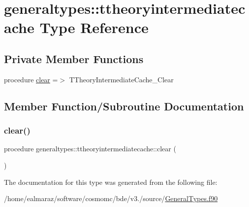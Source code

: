 \hypertarget{structgeneraltypes_1_1ttheoryintermediatecache}{}\section{generaltypes\+:\+:ttheoryintermediatecache Type Reference}
\label{structgeneraltypes_1_1ttheoryintermediatecache}
\subsection*{Private Member Functions}
\begin{DoxyCompactItemize}
\item 
procedure \mbox{\hyperlink{structgeneraltypes_1_1ttheoryintermediatecache_aeaec07f4f40b76814158d58e18392e91}{clear}} =$>$ T\+Theory\+Intermediate\+Cache\+\_\+\+Clear
\end{DoxyCompactItemize}


\subsection{Member Function/\+Subroutine Documentation}
\mbox{\label{structgeneraltypes_1_1ttheoryintermediatecache_aeaec07f4f40b76814158d58e18392e91}} 
\subsubsection{\texorpdfstring{clear()}{clear()}}
{\footnotesize\ttfamily procedure generaltypes\+::ttheoryintermediatecache\+::clear (\begin{DoxyParamCaption}{ }\end{DoxyParamCaption})\hspace{0.3cm}{\ttfamily [private]}}



The documentation for this type was generated from the following file\+:\begin{DoxyCompactItemize}
\item 
/home/ealmaraz/software/cosmomc/bde/v3./source/\mbox{\hyperlink{GeneralTypes_8f90}{General\+Types.\+f90}}\end{DoxyCompactItemize}
